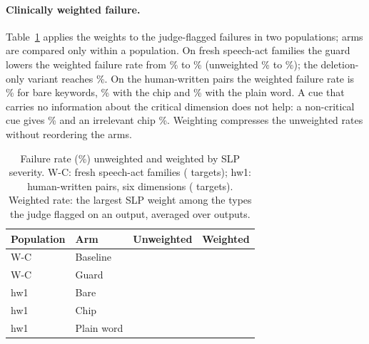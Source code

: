 \paragraph{Clinically weighted failure.}
Table~\ref{tab:s4-weighted} applies the weights to the judge-flagged failures in two populations; arms are compared only within a population.
On fresh speech-act families the guard lowers the weighted failure rate from \jmslpWGuardBase{}\% to \jmslpWGuardG{}\% (unweighted \jmslpUGuardBase{}\% to \jmslpUGuardG{}\%); the deletion-only variant reaches \jmslpWGuardGs{}\%.
On the human-written pairs the weighted failure rate is \jmslpWCueBare{}\% for bare keywords, \jmslpWCueChip{}\% with the chip and \jmslpWCueWord{}\% with the plain word.
A cue that carries no information about the critical dimension does not help: a non-critical cue gives \jmslpWCueNoncrit{}\% and an irrelevant chip \jmslpWCueIrrel{}\%.
Weighting compresses the unweighted rates without reordering the arms.

\begin{table}[t]
\centering\small
\caption{Failure rate (\%) unweighted and weighted by SLP severity. W-C: fresh speech-act families (\jmslpWcN{} targets); hw1: human-written pairs, six dimensions (\jmslpHwN{} targets). Weighted rate: the largest SLP weight among the types the judge flagged on an output, averaged over outputs.}\label{tab:s4-weighted}
\begin{tabular}{@{}llrr@{}}
\toprule
Population & Arm & Unweighted & Weighted \\
\midrule
W-C & Baseline & \jmslpUGuardBase{} & \jmslpWGuardBase{} \\
W-C & Guard & \jmslpUGuardG{} & \jmslpWGuardG{} \\
hw1 & Bare & \jmslpUCueBare{} & \jmslpWCueBare{} \\
hw1 & Chip & \jmslpUCueChip{} & \jmslpWCueChip{} \\
hw1 & Plain word & \jmslpUCueWord{} & \jmslpWCueWord{} \\
\bottomrule
\end{tabular}
\end{table}

